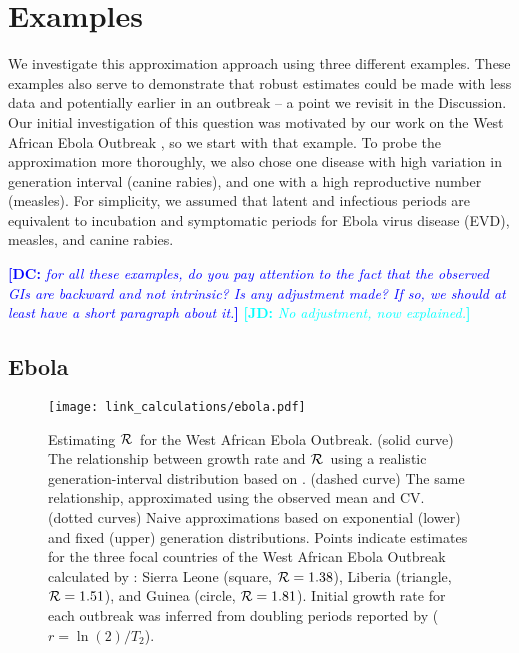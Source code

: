\documentclass[12pt]{article}
\newcommand{\RR}{\ensuremath{{\cal R}}}
\newcommand{\comment}[3]{\textcolor{#1}{\textbf{[#2: }\textit{#3}\textbf{]}}}
\newcommand{\jd}[1]{\comment{cyan}{JD}{#1}}
\newcommand{\dc}[1]{\comment{blue}{DC}{#1}}
\begin{document}
\section{Examples}
\label{Examples}

We investigate this approximation approach using three different examples. 
These examples also serve to demonstrate that robust estimates could be made with less data and potentially earlier in an outbreak -- a point we revisit in the Discussion.
Our initial investigation of this question was motivated by our work on the West African Ebola Outbreak \cite{WeitDush15}, so we start with that example. To probe the approximation more thoroughly, we also chose one disease with high variation in generation interval (canine rabies), and one with a high reproductive number (measles). For simplicity, we assumed that latent and infectious periods are equivalent to incubation and symptomatic periods for Ebola virus disease (EVD), measles, and canine rabies.

\dc{for all these examples, do you pay attention to the fact that the observed GIs are \emph{backward} and not intrinsic? Is any adjustment made? If so, we should at least have a short paragraph about it.} \jd{No adjustment, now explained.}

\subsection{Ebola}
\label{EbolaEx}

\begin{figure}[htbp] \centering
	\texttt{[image: link\_calculations/ebola.pdf]}
	\caption{Estimating \RR~for the West African Ebola Outbreak.
(solid curve) The relationship between growth rate and \RR~using a realistic generation-interval distribution based on \cite{AylwBarb14}.
(dashed curve) The same relationship, approximated using the observed mean and CV. 
(dotted curves) Naive approximations based on exponential (lower) and fixed (upper) generation distributions.
Points indicate estimates for the three focal countries of the West African Ebola Outbreak calculated by \cite{AylwBarb14}: {Sierra Leone (square, $\RR=1.38$), Liberia (triangle, $\RR=1.51$), and Guinea (circle, $\RR=1.81$).} Initial growth rate for each outbreak was inferred from doubling periods reported by \cite{AylwBarb14} ($r = \ln(2)/T_2$).
	\label{fig:EbolaCurve}}
\end{figure}
\end{document}
